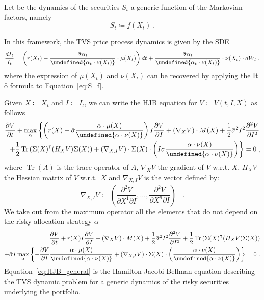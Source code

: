 \documentclass[11pt]{article}
\newcommand{\tr}[1]{{#1}^{\intercal}} %
\DeclareMathOperator{\Tr}{Tr}
\let\norm\undefined %
\DeclarePairedDelimiter\norm{\lVert}{\rVert}
\begin{document}
Let be the dynamics of the securities $S_t$ a generic function of the Markovian factors, namely
\begin{equation}
 S_t \coloneqq  f(X_t) \; .
\label{eq:S_f}\end{equation}

In this framework, the TVS price process dynamics is given by the SDE 
\begin{equation}
	\frac{dI_t}{I_t} = \left(r(X_t) -  \frac{\bar{\sigma} \alpha_t}{\norm{\alpha_t \cdot \nu(X_t)}}  \cdot \mu(X_t)    \right)dt +\frac{\bar{\sigma}\alpha_t }{\norm{ \alpha_t \cdot \nu(X_t) }} \cdot \nu(X_t) \cdot dW_t \; ,
\end{equation}
where the expression of $\mu(X_t)$ and $\nu(X_t)$ can be recovered by applying the It$\hat{\text{o}}$ formula to Equation~\eqref{eq:S_f}.

Given $X \coloneqq X_t$ and $I \coloneqq I_t$, we can write the HJB equation for $V \coloneqq V(t,I,X)$ as follows
\begin{equation}
	\begin{aligned}
		\frac{\partial V}{\partial t} + \max_\alpha  \left\{   \left(r(X) - \bar{\sigma}\frac{\alpha \cdot \mu(X)}{\norm{\alpha \cdot \nu(X)}}\right) I \frac{\partial V}{\partial I} + (\nabla_X V) \cdot M(X) + \frac{1}{2} \bar{\sigma}^2I^2 \frac{\partial^2V}{\partial I^2}  \right.\\ 
		\left. +\frac{1}{2}\Tr\left(\tr{\Sigma(X)}(H_XV)\Sigma(X)\right)  + (\nabla_{X,I}V) \cdot \Sigma(X) \cdot \left(I\bar{\sigma}\frac{\alpha \cdot \nu(X)}{\norm{\alpha \cdot \nu(X)}}\right)\right\} = 0 \; ,
	\end{aligned}
\end{equation}
where $\Tr(A)$ is the trace operator of $A$, $\nabla_X V$ the gradient of $V$ w.r.t. $X$, $H_XV$ the Hessian matrix of $V$ w.r.t.~$X$ and $\nabla_{X,I}V$ is the vector defined by:
\begin{equation}
	\nabla_{X,I} V \coloneqq \tr{\left(\frac{\partial^2 V}{\partial X^1 \partial I},\dots, \frac{\partial^2 V}{\partial X^n \partial I} \right)} \; .
\end{equation}
We take out from the maximum operator all the elements that do not depend on the risky allocation strategy $\alpha$
\begin{equation}
	\begin{aligned}
		\frac{\partial V}{\partial t} +   r(X) I \frac{\partial V}{\partial I} + (\nabla_X V) \cdot M(X) + \frac{1}{2} \bar{\sigma}^2I^2 \frac{\partial^2V}{\partial I^2} + \frac{1}{2}\Tr\left(\tr{\Sigma(X)}(H_XV)\Sigma(X)\right)  \\ 
		+\bar{\sigma}I\max_\alpha  \left\{  -\frac{\partial V}{\partial I}   \frac{\alpha \cdot \mu(X)}{\norm{\alpha \cdot \nu(X)}} + 
		(\nabla_{X,I}V) \cdot \Sigma(X) \cdot \left(\frac{\alpha \cdot \nu(X)}{\norm{\alpha \cdot \nu(X)}}\right)\right\} = 0 \; .
		\end{aligned}
\label{eq:HJB_general}\end{equation}
Equation~\eqref{eq:HJB_general} is the Hamilton-Jacobi-Bellman equation describing the TVS dynamic problem for a generic dynamics of the risky securities underlying the portfolio.
\end{document}
